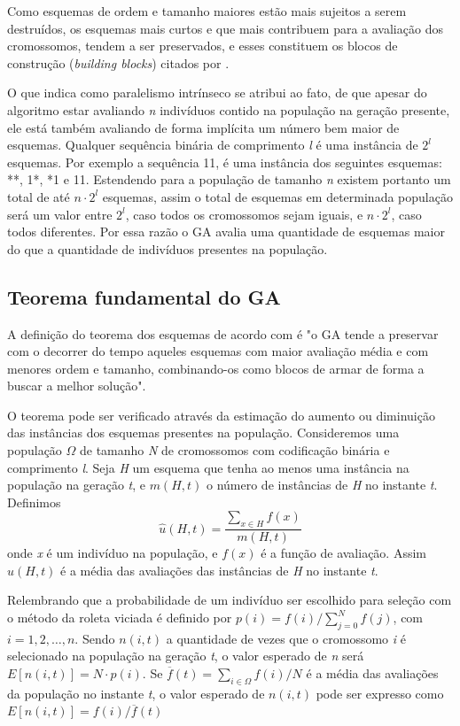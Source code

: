 Como esquemas de ordem e tamanho maiores estão mais sujeitos a serem destruídos, os esquemas mais curtos e que mais contribuem para a avaliação dos cromossomos, tendem a ser preservados, e esses constituem os blocos de construção (\textit{building blocks}) citados por \citeauthor{Goldberg1989}.

O que \citeauthor{Holland1992} indica como paralelismo intrínseco se atribui ao fato, de que apesar do algoritmo estar avaliando \textit{n} indivíduos contido na população na geração presente, ele está também avaliando de forma implícita um número bem maior de esquemas. Qualquer sequência binária de comprimento \textit{l} é uma instância de \(2^l\) esquemas. Por exemplo a sequência 11, é uma instância dos seguintes esquemas: **, 1*, *1 e 11. Estendendo para a população de tamanho \textit{n} existem portanto um total de até \(n \cdot 2^l\) esquemas, assim o total de esquemas em determinada população será um valor entre \(2^l\), caso todos os cromossomos sejam iguais, e \(n \cdot 2^l\), caso todos diferentes. Por essa razão o GA avalia uma quantidade de esquemas maior do que a quantidade de indivíduos presentes na população.

\subsection{Teorema fundamental do GA}
A definição do teorema dos esquemas de acordo com \cite{Linden2008} é "o GA tende a preservar com o decorrer do tempo aqueles esquemas com maior avaliação média e com menores ordem e tamanho, combinando-os como blocos de armar de forma a buscar a melhor solução". 

O teorema pode ser verificado através da estimação do aumento ou diminuição das instâncias dos esquemas presentes na população. Consideremos uma população \(\Omega\) de tamanho \textit{N} de cromossomos com codificação binária e comprimento \textit{l}. Seja \textit{H} um esquema que tenha ao menos uma instância na população na geração \textit{t}, e \(m(H, t)\) o número de instâncias de \textit{H} no instante \textit{t}. Definimos \[\hat{u}(H,t) = \frac{\sum\limits_{x \in H}f(x)}{m(H,t)}\]
onde \textit{x} é um indivíduo na população, e \(f(x)\) é a função de avaliação. Assim \(\hat{u}(H,t)\) é a média das avaliações das instâncias de \textit{H} no instante \textit{t}.

Relembrando que a probabilidade de um indivíduo ser escolhido para seleção com o método da roleta viciada é definido por \(p(i) = f(i) / \sum_{j=0}^{N}{f(j)}\), com \(i = 1,2,\dots,n\). Sendo \(n(i,t)\) a quantidade de vezes que o cromossomo \textit{i} é selecionado na população na geração \textit{t}, o valor esperado de \textit{n} será \(E[n(i,t)] = N \cdot p(i)\). Se \(\overline{f}(t) = \sum_{i \in \Omega} {f(i)} / N\) é a média das avaliações da população no instante \textit{t}, o valor esperado de \(n(i,t)\) pode ser expresso como \(E[n(i,t)] = f(i) / \overline{f}(t)\)

